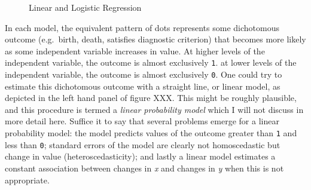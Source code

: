\documentclass[
  letterpaper,
  DIV=11,
  numbers=noendperiod]{scrreprt}
\begin{document}
\begin{figure}


\caption{\label{fig-linear-logistic}Linear and Logistic Regression}

\end{figure}%

In each model, the equivalent pattern of dots represents some
dichotomous outcome (e.g.~birth, death, satisfies diagnostic criterion)
that becomes more likely as some independent variable increases in
value. At higher levels of the independent variable, the outcome is
almost exclusively \texttt{1}. at lower levels of the independent
variable, the outcome is almost exclusively \texttt{0}. One could try to
estimate this dichotomous outcome with a straight line, or linear model,
as depicted in the left hand panel of figure XXX. This might be roughly
plausible, and this procedure is termed a \emph{linear probability
model} which I will not discuss in more detail here. Suffice it to say
that several problems emerge for a linear probability model: the model
predicts values of the outcome greater than \texttt{1} and less than
\texttt{0}; standard errors of the model are clearly not homoscedastic
but change in value (heteroscedasticity); and lastly a linear model
estimates a constant association between changes in \emph{x} and changes
in \emph{y} when this is not appropriate.
\end{document}
